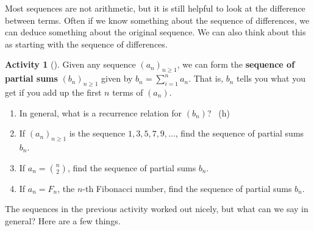 \documentclass[10pt,]{book}
\newcommand{\terminology}[1]{\textbf{#1}}
\theoremstyle{plain}
\theoremstyle{definition}
\theoremstyle{definition}
\theoremstyle{definition}
\newtheorem{activity}[project]{Activity}
\numberwithin{equation}{chapter}
\begin{document}
\par
\hypertarget{p-928}{}%
Most sequences are not arithmetic, but it is still helpful to look at the difference between terms.  Often if we know something about the sequence of differences, we can deduce something about the original sequence.   We can also think about this as starting with the sequence of differences.%
\begin{activity}[]\label{activity-138}
\hypertarget{p-929}{}%
Given any sequence \((a_n)_{n \ge 1}\), we can form the \terminology{sequence of partial sums} \((b_n)_{n \ge 1}\) given by \(b_n = \sum_{i = 1}^n a_n\).  That is, \(b_n\) tells you what you get if you add up the first \(n\) terms of \((a_n)\).%
\begin{enumerate}[font=\bfseries,label=(\alph*),ref=\alph*]
\item\label{task-173} \hypertarget{p-930}{}%
In general, what is a recurrence relation for \((b_n)\)?%
~{\tiny (h)}\item\label{task-174} \hypertarget{p-932}{}%
If \((a_n)_{n \ge 1}\) is the sequence \(1, 3, 5, 7, 9, \ldots\), find the sequence of partial sums \(b_n\).%
\item\label{task-175} \hypertarget{p-933}{}%
If \(a_n = \binom{n}{2}\), find the sequence of partial sums \(b_n\).%
\item\label{task-176} \hypertarget{p-934}{}%
If \(a_n = F_n\), the \(n\)-th Fibonacci number, find the sequence of partial sums \(b_n\).%
\end{enumerate}
\end{activity}
\hypertarget{p-935}{}%
The sequences in the previous activity worked out nicely, but what can we say in general?  Here are a few things.%
\end{document}
